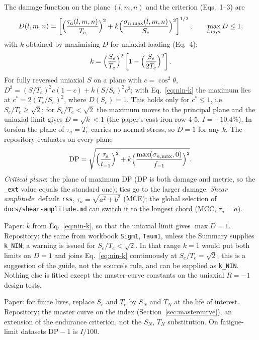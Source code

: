  The damage function on the plane $(l,m,n)$ and the criterion (Eqs.~1--3) are
\begin{equation}
D(l,m,n) = \left[\Bigl(\frac{\tau_a(l,m,n)}{T_e}\Bigr)^2 + k\Bigl(\frac{\sigma_{n,\max}(l,m,n)}{S_e}\Bigr)^2\right]^{1/2},
\qquad \max_{l,m,n} D \le 1 ,
\label{eq:nin}
\end{equation}
with $k$ obtained by maximising $D$ for uniaxial loading (Eq.~4):
\begin{equation}
k = \Bigl(\frac{S_e}{T_e}\Bigr)^2\left[1-\Bigl(\frac{S_e}{2T_e}\Bigr)^2\right] .
\label{eq:nin-k}
\end{equation}
For fully reversed uniaxial $S$ on a plane with $c=\cos^2\theta$,
$D^2 = (S/T_e)^2 c(1-c) + k(S/S_e)^2c^2$; with Eq.~\eqref{eq:nin-k} the maximum lies at
$c^*=2(T_e/S_e)^2$, where $D(S_e)=1$. This holds only for $c^*\le1$, i.e.\ $S_e/T_e\ge\sqrt2$; for
$S_e/T_e<\sqrt2$ the maximum moves to the principal plane and the uniaxial limit gives
$D=\sqrt k<1$ (the paper's cast-iron row 4-5, $I=-10.4\%$). In torsion the plane of $\tau_a=T_e$
carries no normal stress, so $D=1$ for any $k$. The repository evaluates on every plane
\begin{equation}
\mathrm{DP} = \sqrt{\Bigl(\frac{\tau_a}{t_{-1}}\Bigr)^2 + k\Bigl(\frac{\max(\sigma_{n,\max},0)}{f_{-1}}\Bigr)^2} .
\label{eq:nin-dp}
\end{equation}
\emph{Critical plane}: the plane of maximum DP (DP is both damage and metric, so the \texttt{\_ext}
value equals the standard one); ties go to the larger damage. \emph{Shear amplitude}: default
\texttt{rss}, $\tau_a=\sqrt{a^2+b^2}$ (MCE); the global selection of \texttt{docs/shear-amplitude.md}
can switch it to the longest chord (MCC, $\tau_a=a$).

 Paper: $k$ from Eq.~\eqref{eq:nin-k}, so that the uniaxial limit
gives $\max D=1$. Repository: the same from workbook \texttt{Sigm1}, \texttt{Taum1}, unless the
Summary supplies \texttt{k\_NIN}; a warning is issued for $S_e/T_e<\sqrt2$. In that range $k=1$ would
put both limits on $D=1$ and joins Eq.~\eqref{eq:nin-k} continuously at $S_e/T_e=\sqrt2$; this is a
suggestion of the guide, not the source's rule, and can be supplied as \texttt{k\_NIN}. Nothing else
is fitted except the master-curve constants on the uniaxial $R=-1$ design tests.

 Paper: for finite lives, replace $S_e$ and $T_e$ by $S_N$ and $T_N$ at the life of
interest. Repository: the master curve on the index (Section~\ref{sec:mastercurve}), an extension of
the endurance criterion, not the $S_N$, $T_N$ substitution. On fatigue-limit datasets
$\mathrm{DP}-1$ is $I/100$.

